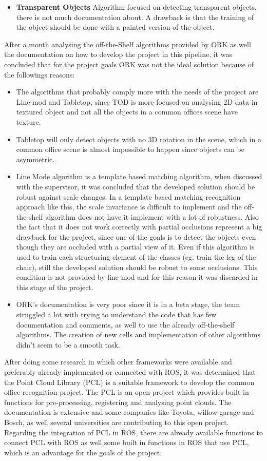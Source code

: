 \documentclass[fontsize=12pt]{article}
\begin{document}
\begin{itemize}
\item\textbf{Transparent Objects} Algorithm focused on detecting transparent objects, there is not much documentation about. A drawback is that the training of the object should be done with a painted version of the object. 
\end{itemize}
After  a month analysing the off-the-Shelf algorithms provided by ORK as well the documentation on how to develop the project in this pipeline, it was concluded that for the project goals ORK was not the ideal solution because of the followings reasons:
\begin{itemize}
\item The algorithms that probably comply more with the needs of the project are Line-mod and Tabletop, since TOD is more focused on analysing 2D data in textured object and not all the objects in a common offices scene have texture.
\item Tabletop will only detect objects with no 3D rotation in the scene, which  in a common office scene is almost impossible to happen since objects can be asymmetric.
\item Line Mode algorithm is a template based matching algorithm, when discussed with the supervisor, it was concluded that the developed solution should be robust against scale changes. In a template based matching recognition approach like this, the scale invariance is difficult to implement and the off-the-shelf algorithm does not have it implement with a lot of robustness. Also the fact that it does not work correctly with partial occlusions represent a big drawback for the project, since one of the goals is to detect the objects even though they are occluded with a partial view of it. Even if this algorithm is used to train each structuring element of the classes (eg. train the leg of the chair), still the developed solution should be robust to some occlusions. This condition is not provided by line-mod and for this reason it was discarded in this stage of the project. 
\item ORK's documentation is very poor since it is in a beta stage, the team struggled a lot with trying to understand the code that has few documentation and comments, as well to use the already off-the-shelf algorithms. The creation of new cells and implementation of other algorithms didn't seem to be a smooth task.  
\end{itemize} 
After doing some research in which other frameworks were available and preferably already implemented or connected with ROS, it was  determined that the Point Cloud Library (PCL) \cite{bib:pcl} is a suitable framework to develop the common office recognition project.
The PCL is an open project which provides built-in functions for pre-processing, registering and analysing point clouds. The documentation is extensive and some companies like Toyota, willow garage and Bosch, as well several universities are contributing to this open project. Regarding the integration of PCL in ROS, there are already available functions to connect PCL with ROS as well some built in functions in ROS that use PCL, which is an advantage for the goals of the project. \\
\end{document}
